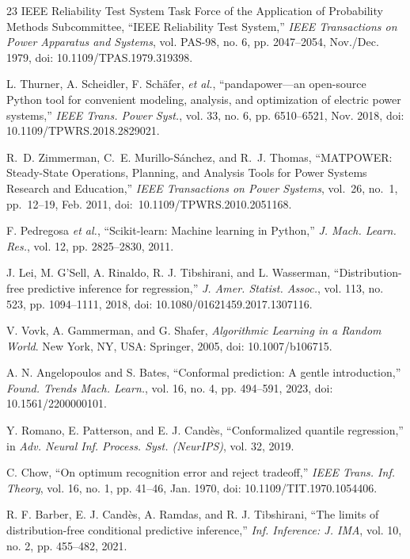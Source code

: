 \documentclass[12pt]{article}
\begin{document}
\begin{thebibliography}{23}
 IEEE Reliability Test System Task Force of the Application of Probability Methods Subcommittee, ``IEEE Reliability Test System,'' \textit{IEEE Transactions on Power Apparatus and Systems}, vol. PAS-98, no. 6, pp. 2047--2054, Nov./Dec. 1979, doi: 10.1109/TPAS.1979.319398.

 L. Thurner, A. Scheidler, F. Sch\"afer, \textit{et al.}, ``pandapower---an open-source Python tool for convenient modeling, analysis, and optimization of electric power systems,'' \textit{IEEE Trans. Power Syst.}, vol. 33, no. 6, pp. 6510--6521, Nov. 2018, doi: 10.1109/TPWRS.2018.2829021.

 R.~D. Zimmerman, C.~E. Murillo-S{\'a}nchez, and R.~J. Thomas, ``MATPOWER: Steady-State Operations, Planning, and Analysis Tools for Power Systems Research and Education,'' {\em IEEE Transactions on Power Systems}, vol.~26, no.~1, pp.~12--19, Feb. 2011, doi:~10.1109/TPWRS.2010.2051168.

 F. Pedregosa \textit{et al.}, ``Scikit-learn: Machine learning in Python,'' \textit{J. Mach. Learn. Res.}, vol. 12, pp. 2825--2830, 2011.

 J. Lei, M. G'Sell, A. Rinaldo, R. J. Tibshirani, and L. Wasserman, ``Distribution-free predictive inference for regression,'' \textit{J. Amer. Statist. Assoc.}, vol. 113, no. 523, pp. 1094--1111, 2018, doi: 10.1080/01621459.2017.1307116.

 V. Vovk, A. Gammerman, and G. Shafer, \textit{Algorithmic Learning in a Random World}. New York, NY, USA: Springer, 2005, doi: 10.1007/b106715.
  
 A. N. Angelopoulos and S. Bates, ``Conformal prediction: A gentle introduction,'' \textit{Found. Trends Mach. Learn.}, vol. 16, no. 4, pp. 494--591, 2023, doi: 10.1561/2200000101.

 Y. Romano, E. Patterson, and E. J. Cand\`es, ``Conformalized quantile regression,'' in \textit{Adv. Neural Inf. Process. Syst. (NeurIPS)}, vol. 32, 2019.

 C. Chow, ``On optimum recognition error and reject tradeoff,'' \textit{IEEE Trans. Inf. Theory}, vol. 16, no. 1, pp. 41--46, Jan. 1970, doi: 10.1109/TIT.1970.1054406.

 R. F. Barber, E. J. Cand\`es, A. Ramdas, and R. J. Tibshirani, ``The limits of distribution-free conditional predictive inference,'' \textit{Inf. Inference: J. IMA}, vol. 10, no. 2, pp. 455--482, 2021.


\end{thebibliography}
\end{document}
